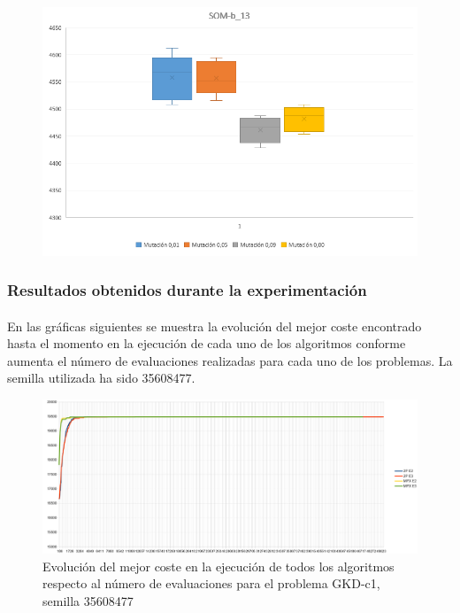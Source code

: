 	\begin{figure}[H]
		
		\centering
		\includegraphics[scale=0.7]{img/BigotesMutacion0SOM_3}
		
	\end{figure}

	\subsubsection{Resultados obtenidos durante la experimentación}

	\paragraph{} En las gráficas siguientes se muestra la evolución del mejor coste encontrado hasta el momento en la ejecución de cada uno de los algoritmos conforme aumenta el número de evaluaciones realizadas para cada uno de los problemas. La semilla utilizada ha sido 35608477.

	\begin{figure}[H]
		\centering
		\includegraphics[scale=0.3]{img/35608477_GKD-c_1_n500_m50.png}
		\caption{Evolución del mejor coste en la ejecución de todos los algoritmos respecto al número de evaluaciones para el problema GKD-c1, semilla 35608477}
		\label{gkd-c1_historico}
	\end{figure}


